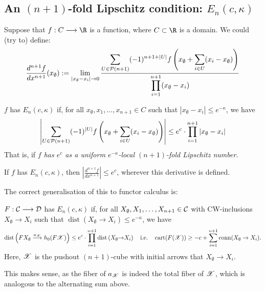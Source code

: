 \documentclass[11pt]{article}
\DeclareMathOperator{\dist}{dist}
\DeclareMathOperator{\cartesianness}{cart}
\begin{document}
\begin{Calculus II}
\subsection*{An $(n+1)$-fold Lipschitz condition: $E_n(c,\kappa)$}
Suppose that $f:C\to \R$ is a function, where $C\subset\R$ is a domain. We could (try to) define:
%
\[\frac{d^{n+1}f}{dx^{n+1}}(x_{\emptyset }):=\lim_{|x_\emptyset -x_i|\rightarrow0}\frac{\displaystyle\sum_{U\in \mathcal{P}(n+1)}(-1)^{n+1+|U|}f\left(x_\emptyset+\sum_{i\in U}(x_i-x_\emptyset)\right)}{\displaystyle\prod_{i=1}^{n+1}(x_\emptyset -x_i)}\]
\begin{defn*}
 $f$ has $E_n(c,\kappa)$ if, for all $x_\emptyset ,x_1,\ldots,x_{n+1}\in C$ such that $|x_\emptyset -x_i|\leq e^{-\kappa}$, we have 
\[\left|\sum_{U\in \mathcal{P}(n+1)}(-1)^{|U|}f\left(x_\emptyset+\sum_{i\in U}(x_i-x_\emptyset)\right)\right|
\leq e^{c}\cdot\prod_{i=1}^{n+1} \left| x_\emptyset -x_i\right|\]
That is, if \emph{$f$ has $e^c$ as a uniform $e^{-\kappa}$-local $(n+1)$-fold Lipschitz number.}
\end{defn*}
\begin{observation}
If $f$ has $E_n(c,\kappa)$, then $\left|\frac{d^{n+1}f}{dx^{n+1}}\right|\leq e^c$, wherever this derivative is defined.
\end{observation}
The correct generalisation of this to functor calculus is:
\begin{defn*}
$F:\mathcal{C}\longrightarrow\mathcal{D}$ has $E_n(c,\kappa)$ if, for all $X_\emptyset ,X_1,\ldots,X_{n+1}\in \mathcal{C}$ with CW-inclusions $X_\emptyset\rightarrow X_i$ such that $\dist(X_\emptyset\rightarrow X_i)\leq e^{-\kappa}$, we have 
\[\dist\left(FX_\emptyset\overset{a_{\scrx}}{\to} h_0(F\scrX)\right)\leq e^{c}
\cdot\prod_{i=1}^{n+1} \dist\left(X_\emptyset{\rightarrow} X_i\right)\quad \textup{i.e.}\quad \cartesianness(F(\scrx))\geq -c+\sum_{i=1}^{n+1}\conn(X_{\emptyset }\rightarrow X_i).\]
Here, $\mathscr{X}$ is the pushout $(n+1)$-cube with initial arrows that $X_\emptyset \rightarrow X_i$.
\end{defn*}
This makes sense, as the fiber of $a_{\mathscr{X}}$ is indeed the total fiber of $\mathscr{X}$, which is analogous to the alternating sum above.


\end{Calculus II}
\end{document}
